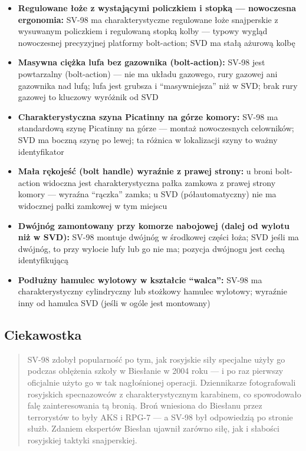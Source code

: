 \documentclass[12pt,oneside]{book}
\providecommand{\tightlist}{%
  \setlength{\itemsep}{0pt}\setlength{\parskip}{0pt}}
\begin{document}
\begin{itemize}
\tightlist
\item
  \textbf{Regulowane łoże z wystającymi policzkiem i stopką ---
  nowoczesna ergonomia:} SV-98 ma charakterystyczne regulowane łoże
  snajperskie z wysuwanym policzkiem i regulowaną stopką kolby ---
  typowy wygląd nowoczesnej precyzyjnej platformy bolt-action; SVD ma
  stałą ażurową kolbę
\item
  \textbf{Masywna ciężka lufa bez gazownika (bolt-action):} SV-98 jest
  powtarzalny (bolt-action) --- nie ma układu gazowego, rury gazowej ani
  gazownika nad lufą; lufa jest grubsza i ``masywniejsza'' niż w SVD;
  brak rury gazowej to kluczowy wyróżnik od SVD
\item
  \textbf{Charakterystyczna szyna Picatinny na górze komory:} SV-98 ma
  standardową szynę Picatinny na górze --- montaż nowoczesnych
  celowników; SVD ma boczną szynę po lewej; ta różnica w lokalizacji
  szyny to ważny identyfikator
\item
  \textbf{Mała rękojeść (bolt handle) wyraźnie z prawej strony:} u broni
  bolt-action widoczna jest charakterystyczna pałka zamkowa z prawej
  strony komory --- wyraźna ``rączka'' zamka; u SVD (półautomatyczny)
  nie ma widocznej pałki zamkowej w tym miejscu
\item
  \textbf{Dwójnóg zamontowany przy komorze nabojowej (dalej od wylotu
  niż w SVD):} SV-98 montuje dwójnóg w środkowej części łoża; SVD jeśli
  ma dwójnóg, to przy wylocie lufy lub go nie ma; pozycja dwójnogu jest
  cechą identyfikującą
\item
  \textbf{Podłużny hamulec wylotowy w kształcie ``walca'':} SV-98 ma
  charakterystyczny cylindryczny lub stożkowy hamulec wylotowy; wyraźnie
  inny od hamulca SVD (jeśli w ogóle jest montowany)
\end{itemize}

\subsection{Ciekawostka}\label{ciekawostka-78}

\begin{quote}
SV-98 zdobył popularność po tym, jak rosyjskie siły specjalne użyły go
podczas oblężenia szkoły w Biesłanie w 2004 roku --- i po raz pierwszy
oficjalnie użyto go w tak nagłośnionej operacji. Dziennikarze
fotografowali rosyjskich specnazowców z charakterystycznym karabinem, co
spowodowało falę zainteresowania tą bronią. Broń wniesiona do Biesłanu
przez terrorystów to były AKS i RPG-7 --- a SV-98 był odpowiedzią po
stronie służb. Zdaniem ekspertów Biesłan ujawnił zarówno siłę, jak i
słabości rosyjskiej taktyki snajperskiej.
\end{quote}
\end{document}
